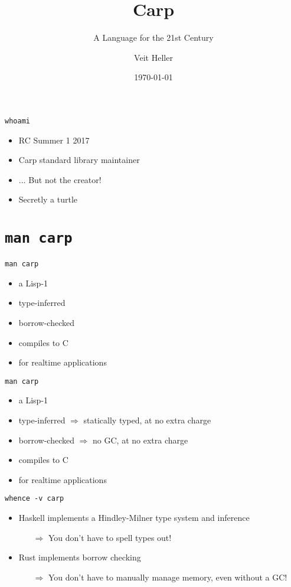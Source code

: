 \documentclass[aspectratio=169]{beamer}
\title{Carp}
\subtitle{A Language for the 21st Century}
\date{\today}
\author{Veit Heller}
\institute{Port Zero}
\begin{document}
  \maketitle
  \begin{frame}{\texttt{whoami}}
    \begin{itemize}
      \item RC Summer 1 2017
      \item Carp standard library maintainer
      \item ... But not the creator!
      \item Secretly a turtle
    \end{itemize}
  \end{frame}
  \section{\texttt{man carp}}
  \begin{frame}{\texttt{man carp}}
    \begin{itemize}
      \item a Lisp-1
      \item type-inferred
      \item borrow-checked
      \item compiles to C
      \item for realtime applications
    \end{itemize}
  \end{frame}
  \begin{frame}{\texttt{man carp}}
    \begin{itemize}
      \item a Lisp-1
      \item type-inferred $\Rightarrow$ statically typed, at no extra charge
      \item borrow-checked $\Rightarrow$ no GC, at no extra charge
      \item compiles to C
      \item for realtime applications
    \end{itemize}
  \end{frame}
  \begin{frame}{\texttt{whence -v carp}}
    \begin{itemize}
      \item Haskell implements a Hindley-Milner type system and inference
      \begin{itemize}
        \item[$\Rightarrow$] You don’t have to spell types out!
      \end{itemize}
      \item Rust implements borrow checking
      \begin{itemize}
        \item[$\Rightarrow$] You don’t have to manually manage memory, even without a GC!
      \end{itemize}
    \end{itemize}
  \end{frame}
\end{document}
